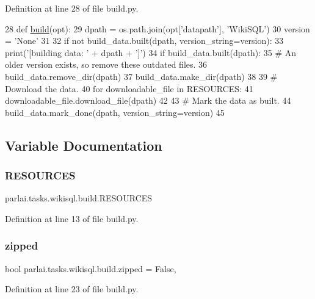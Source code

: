 Definition at line 28 of file build.\+py.


\begin{DoxyCode}
28 \textcolor{keyword}{def }\hyperlink{namespacedialog__babi__feedback_1_1build_a7a9d289f7493a5ded13c4b7f071b6184}{build}(opt):
29     dpath = os.path.join(opt[\textcolor{stringliteral}{'datapath'}], \textcolor{stringliteral}{'WikiSQL'})
30     version = \textcolor{stringliteral}{'None'}
31 
32     \textcolor{keywordflow}{if} \textcolor{keywordflow}{not} build\_data.built(dpath, version\_string=version):
33         print(\textcolor{stringliteral}{'[building data: '} + dpath + \textcolor{stringliteral}{']'})
34         \textcolor{keywordflow}{if} build\_data.built(dpath):
35             \textcolor{comment}{# An older version exists, so remove these outdated files.}
36             build\_data.remove\_dir(dpath)
37         build\_data.make\_dir(dpath)
38 
39         \textcolor{comment}{# Download the data.}
40         \textcolor{keywordflow}{for} downloadable\_file \textcolor{keywordflow}{in} RESOURCES:
41             downloadable\_file.download\_file(dpath)
42 
43         \textcolor{comment}{# Mark the data as built.}
44         build\_data.mark\_done(dpath, version\_string=version)
45 \end{DoxyCode}


\subsection{Variable Documentation}
\mbox{\label{namespaceparlai_1_1tasks_1_1wikisql_1_1build_a6f28762458bfec32a46855606ded0884}} 
\subsubsection{\texorpdfstring{R\+E\+S\+O\+U\+R\+C\+ES}{RESOURCES}}
{\footnotesize\ttfamily parlai.\+tasks.\+wikisql.\+build.\+R\+E\+S\+O\+U\+R\+C\+ES}



Definition at line 13 of file build.\+py.

\mbox{\label{namespaceparlai_1_1tasks_1_1wikisql_1_1build_a24348716135950e8cff60a67869738bc}} 
\subsubsection{\texorpdfstring{zipped}{zipped}}
{\footnotesize\ttfamily bool parlai.\+tasks.\+wikisql.\+build.\+zipped = False,}



Definition at line 23 of file build.\+py.

